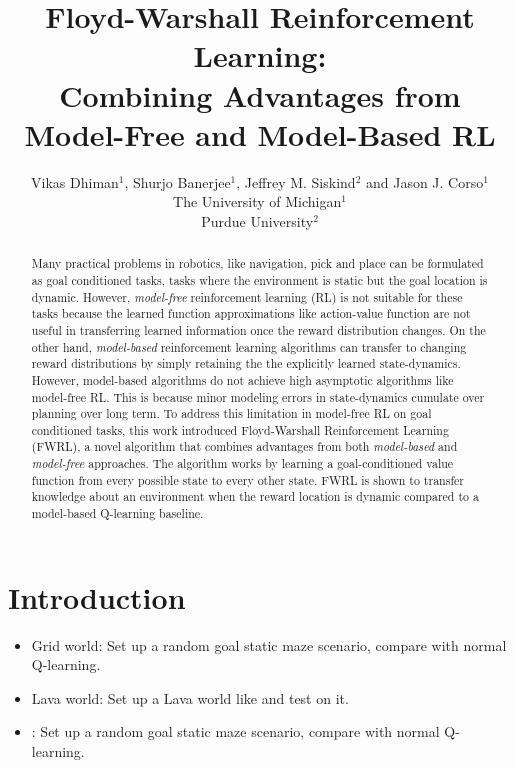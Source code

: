 \documentclass[letterpaper]{article} %
\title{Floyd-Warshall Reinforcement Learning: \\Combining Advantages from
Model-Free and Model-Based RL}
\author{Vikas Dhiman$^1$, Shurjo Banerjee$^1$, Jeffrey M. Siskind$^2$ and Jason J.
Corso$^1$\\
The University of Michigan$^1$\\
Purdue University$^2$}
\begin{document}
\maketitle
\begin{abstract}
Many practical problems in robotics, like navigation, pick and place can be
formulated as goal conditioned tasks, tasks where the environment is static but
the goal location is dynamic.
However, \emph{model-free} reinforcement learning (RL) is not suitable for these
tasks because the learned function approximations like action-value function are
not useful in transferring learned information once the reward distribution
changes.
On the other hand, \emph{model-based} reinforcement learning algorithms can
transfer to changing reward distributions by simply retaining the the
explicitly learned state-dynamics. However, model-based algorithms do not
achieve high asymptotic algorithms like model-free RL. This is because minor
modeling errors in state-dynamics cumulate over planning over long term.
To address this limitation in model-free RL on goal conditioned tasks, 
this work introduced Floyd-Warshall Reinforcement Learning (FWRL), a novel
algorithm that combines advantages from both \emph{model-based} and
\emph{model-free} approaches.
The algorithm works by learning a goal-conditioned value function from every
possible state to every other state.
FWRL is shown to transfer knowledge about an environment when the reward
location is dynamic compared to a model-based Q-learning baseline.
\end{abstract}


\section{ Introduction}



%













%



\begin{itemize}
    \item Grid world: Set up a random goal static maze scenario, compare with normal Q-learning.
    \item Lava world: Set up a Lava world like \cite{schaul2015universal} and test on it.
    \item {}: Set up a random goal static maze scenario, compare with normal Q-learning. 
\end{itemize}



\def\localbib{/home/dhiman/wrk/group-bib/shared}
\IfFileExists{\localbib.bib}{
}{
}

\end{document}
